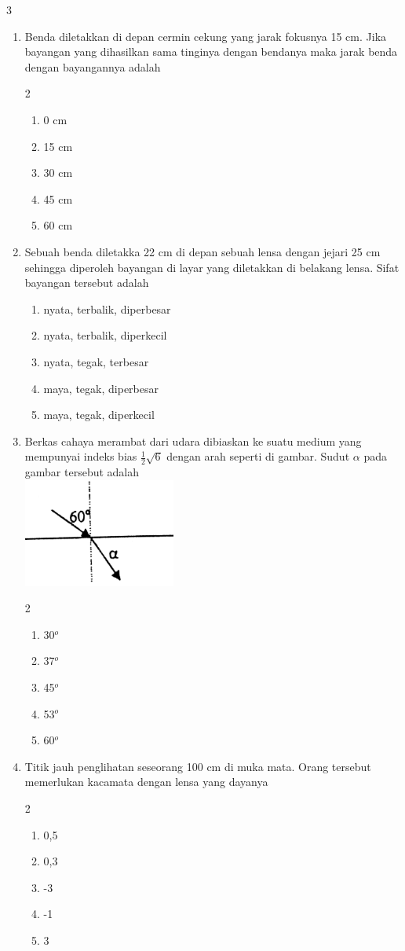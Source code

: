 \documentclass[10pt,a4paper]{extarticle}
\newcommand*\pilgan[1]{
\begin{enumerate}[label=\Alph*., itemsep=0pt,topsep=0pt,leftmargin=*,align=Center] #1 
\end{enumerate}}
\newcommand{\pilgani}[1]{                            \vspace{-0.3cm}\begin{multicols}{2}
 \begin{enumerate}[label=\Alph*., itemsep=0pt,topsep=0pt,leftmargin=*,align=Center]#1                     \end{enumerate}
 \phantom{ini cuma sapi, wedus, dan ayam}
 \end{multicols}}
\begin{document}
\begin{multicols}{3}
\begin{enumerate}
\item Benda diletakkan di depan cermin cekung yang jarak fokusnya 15 cm. Jika bayangan yang dihasilkan sama tinginya dengan bendanya maka jarak benda dengan bayangannya adalah
\pilgani{
   \item 0 cm
   \item 15 cm
   \item 30 cm
   \item 45 cm
   \item 60 cm}
   \vspace{2cm}

\item Sebuah benda diletakka 22 cm di depan sebuah lensa dengan jejari 25 cm sehingga diperoleh bayangan di layar yang diletakkan di belakang lensa. Sifat bayangan tersebut adalah
\pilgan{
   \item nyata, terbalik, diperbesar
   \item nyata, terbalik, diperkecil
   \item nyata, tegak, terbesar
   \item maya, tegak, diperbesar
   \item maya, tegak, diperkecil
}
\vspace{2.5cm}

\item Berkas cahaya merambat dari udara dibiaskan ke suatu medium yang mempunyai indeks bias $\frac{1}{2}\sqrt{6}$ dengan arah seperti di gambar. Sudut $\alpha$ pada gambar tersebut adalah\\
\includegraphics[width=5cm]{pic/lab-3}
\pilgani{
   \item 30$^o$
   \item 37$^o$
   \item 45$^o$
   \item 53$^o$
   \item 60$^o$
}
\vspace{2cm}






\item Titik jauh penglihatan seseorang 100 cm di muka mata. Orang tersebut memerlukan kacamata dengan lensa yang dayanya 
\pilgani{
   \item 0,5
   \item 0,3
   \item -3
   \item -1
   \item 3}


\end{enumerate}
\end{multicols}
\end{document}
